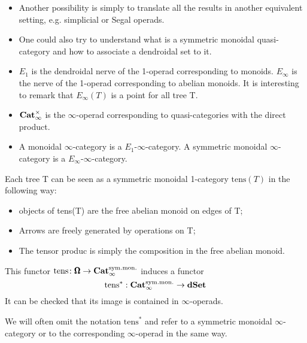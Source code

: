 \begin{refsection}
\begin{itemize}
	\item Another possibility is simply to translate all the results in another equivalent setting, e.g. simplicial or Segal operads.
	
	\item One could also try to understand what is a symmetric monoidal quasi-category and how to associate a dendroidal set to it.
\end{itemize}

\begin{definition}
\begin{itemize}
	\item $E_1$ is the dendroidal nerve of the 1-operad corresponding to monoids. $E_{\infty}$ is the nerve of the 1-operad corresponding to abelian monoids. It is interesting to remark that $E_{\infty}(T)$ is a point for all tree T.

	\item $\mathbf{Cat}_{\infty}^{\times}$ is the $\infty$-operad corresponding to quasi-categories with the direct product.

	\item A monoidal $\infty$-category is a $E_1$-$\infty$-category. A symmetric monoidal $\infty$-category is a $E_{\infty}$-$\infty$-category. 
\end{itemize}
\end{definition}

\begin{proposition}
Each tree T can be seen as a symmetric monoidal 1-category $\mathrm{tens}(T)$ in the following way:
\begin{itemize}
	\item objects of tens(T) are the free abelian monoid on edges of T;

	\item Arrows are freely generated by operations on T;

	\item The tensor produc is simply the composition in the free abelian monoid.
\end{itemize}
This functor $\mathrm{tens} \colon \pmb{\Omega} \to \mathbf{Cat}_\infty^{\mathrm{sym. mon.}}$ induces a functor
\[
\mathrm{tens}^*: \mathbf{Cat}_{\infty}^{\mathrm{sym. mon.}} \to \mathbf{dSet}
\]
It can be checked that its image is contained in $\infty$-operads.

We will often omit the notation $\mathrm{tens}^*$ and refer to a symmetric monoidal $\infty$-category or to the corresponding $\infty$-operad in the same way.
\end{proposition}


\end{refsection}
